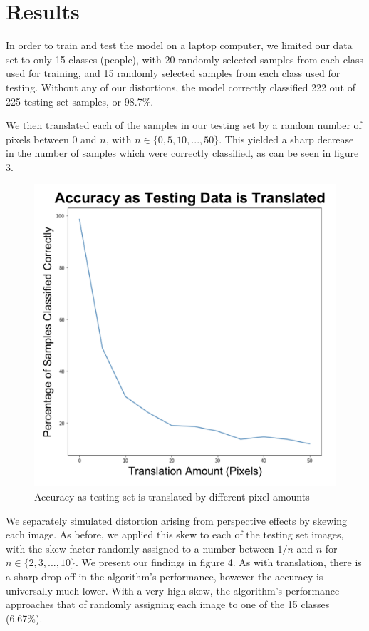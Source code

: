 \documentclass{amsart}
\theoremstyle{definition}
\theoremstyle{remark}
\begin{document}
\section{Results}

In order to train and test the model on a laptop computer, we limited our data set to only 15 classes (people), with 20 randomly selected samples from each class used for training, and 15 randomly selected samples from each class used for testing. Without any of our distortions, the model correctly classified 222 out of 225 testing set samples, or 98.7\%.

We then translated each of the samples in our testing set by a random number of pixels between 0 and $n$, with $n\in\{0,5,10,...,50\}$. This yielded a sharp decrease in the number of samples which were correctly classified, as can be seen in figure 3.

\begin{figure}
\caption{Accuracy as testing set is translated by different pixel amounts}
\includegraphics[scale=0.25]{figures/Translation.png}
\end{figure}

We separately simulated distortion arising from perspective effects by skewing each image. As before, we applied this skew to each of the testing set images, with the skew factor randomly assigned to a number between $1/n$ and $n$ for $n\in\{2,3,...,10\}$. We present our findings in figure 4. As with translation, there is a sharp drop-off in the algorithm's performance, however the accuracy is universally much lower. With a very high skew, the algorithm's performance approaches that of randomly assigning each image to one of the 15 classes (6.67\%).
\end{document}
